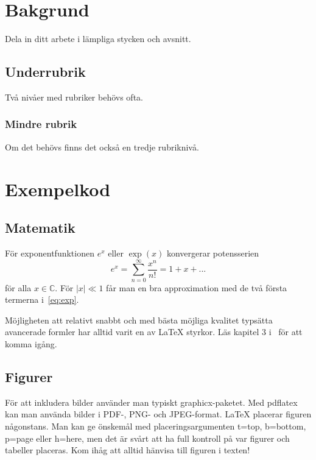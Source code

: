 \documentclass[swedish, 12pt, a4paper, elec, utf8, a-2b, online]{aaltothesis}
\begin{document}
\clearpage
\section{Bakgrund}

Dela in ditt arbete i lämpliga stycken och avsnitt.

\subsection{Underrubrik}

Två nivåer med rubriker behövs ofta.

\subsubsection{Mindre rubrik}

Om det behövs finns det också en tredje rubriknivå.

\clearpage
\section{Exempelkod}

\subsection{Matematik}
\label{sec:matematik}

För exponentfunktionen $e^x$ eller $\exp(x)$ konvergerar potensserien
\begin{equation}
\label{eq:exp}
e^x = \sum_{n=0}^\infty\frac{x^n}{n!}
= 1 + x + ...
\end{equation}
för alla $x\in\mathbb C$. För $|x|\ll 1$ får man en bra approximation
med de två första termerna i~\eqref{eq:exp}.

Möjligheten att relativt snabbt och med bästa möjliga kvalitet
typsätta avancerade formler har alltid varit en av \LaTeX{}
styrkor. Läs kapitel 3 i~\cite{lshort} för att komma igång.

\subsection{Figurer}
\label{sec:figurer}

För att inkludera bilder använder man typiskt graphicx-paketet. Med
pdflatex kan man använda bilder i PDF-, PNG- och JPEG-format. \LaTeX{}
placerar figuren någonstans. Man kan ge önskemål med
placeringsargumenten t=top, b=bottom, p=page eller h=here, men det är
svårt att ha full kontroll på var figurer och tabeller placeras. Kom
ihåg att alltid hänvisa till figuren i texten!
\end{document}
